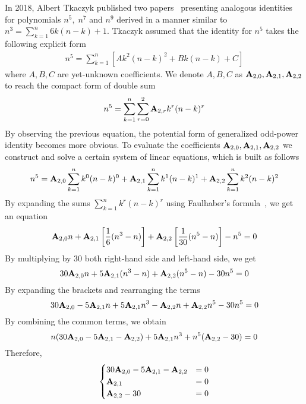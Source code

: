 In 2018, Albert Tkaczyk published two papers~\cite{tkaczyk2018problem, tkaczyk2018continuation}
presenting analogous identities for polynomials $n^5, \; n^7$ and $n^9$
derived in a manner similar to $n^3 = \sum_{k=1}^{n} 6k(n-k) + 1$.
Tkaczyk assumed that the identity for $n^5$ takes the following explicit form
\begin{align*}
    n^5 = \sum_{k=1}^{n} \left[ A k^2(n-k)^2 + Bk(n-k) + C \right]
\end{align*}
where $A,B,C$ are yet-unknown coefficients.
We denote $A,B,C$ as ${\mathbf{A}} \sb{2,0}, {\mathbf{A}} \sb{2,1}, {\mathbf{A}} \sb{2,2}$
to reach the compact form of double sum
\begin{align*}
    n^5 = \sum_{k=1}^{n} \sum_{r=0}^{2} {\mathbf{A}} \sb{2,r} k^r (n-k)^r
\end{align*}
By observing the previous equation, the potential form of generalized odd-power identity becomes more obvious.
To evaluate the coefficients ${\mathbf{A}} \sb{2,0}, {\mathbf{A}} \sb{2,1}, {\mathbf{A}} \sb{2,2}$
we construct and solve a certain system of linear equations, which is
built as follows
\begin{align*}
    n^5 = {\mathbf{A}} \sb{2,0} \sum_{k=1}^{n} k^0 (n-k)^0 + {\mathbf{A}} \sb{2,1} \sum_{k=1}^{n} k^1 (n-k)^1 + {\mathbf{A}} \sb{2,2} \sum_{k=1}^{n} k^2 (n-k)^2
\end{align*}
By expanding the sums $\sum_{k=1}^{n} k^r (n-k)^r$ using Faulhaber's formula~\cite{beardon1996sums}, we get
an equation
\begin{equation*}
    {\mathbf{A}} \sb{2,0} n
    + {\mathbf{A}} \sb{2,1} \left[ \frac{1}{6} (n^3-n) \right]
    + {\mathbf{A}} \sb{2,2} \left[ \frac{1}{30} (n^5-n) \right] - n^5 = 0
\end{equation*}
By multiplying by $30$ both right-hand side and left-hand side, we get
\begin{equation*}
    30 {\mathbf{A}} \sb{2,0} n + 5 {\mathbf{A}} \sb{2,1} (n^3-n) + {\mathbf{A}} \sb{2,2} (n^5-n) - 30n^5 = 0
\end{equation*}
By expanding the brackets and rearranging the terms
\begin{equation*}
    30 {\mathbf{A}} \sb{2,0} - 5 {\mathbf{A}} \sb{2,1} n + 5 {\mathbf{A}} \sb{2,1} n^3 - {\mathbf{A}} \sb{2,2} n + {\mathbf{A}} \sb{2,2} n^5 - 30n^5 = 0
\end{equation*}
By combining the common terms, we obtain
\begin{equation*}
    n (30 {\mathbf{A}} \sb{2,0} - 5 {\mathbf{A}} \sb{2,1} - {\mathbf{A}} \sb{2,2}) + 5 {\mathbf{A}} \sb{2,1} n^3 + n^5 ({\mathbf{A}} \sb{2,2} - 30) = 0
\end{equation*}
Therefore,
\begin{equation*}
    \begin{cases}
        30 {\mathbf{A}} \sb{2,0} - 5 {\mathbf{A}} \sb{2,1} - {\mathbf{A}} \sb{2,2} &= 0 \\
        {\mathbf{A}} \sb{2,1} &= 0 \\
        {\mathbf{A}} \sb{2,2} - 30 &= 0
    \end{cases}
\end{equation*}
